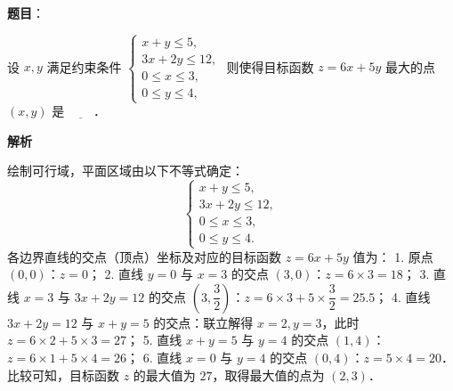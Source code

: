 \begin{answer}

\textbf{题目}：

设 $x, y$ 满足约束条件 $\begin{cases} x + y \leqslant 5, \\ 3x + 2y \leqslant 12, \\ 0 \leqslant x \leqslant 3, \\ 0 \leqslant y \leqslant 4, \end{cases}$ 则使得目标函数 $z = 6x + 5y$ 最大的点 $(x, y)$ 是 $\underline{\hspace{2em}}$．

\textbf{解析}

绘制可行域，平面区域由以下不等式确定：
\nopagebreak[4]
\[
\begin{cases} x + y \leqslant 5, \\ 3x + 2y \leqslant 12, \\ 0 \leqslant x \leqslant 3, \\ 0 \leqslant y \leqslant 4. \end{cases}
\]
各边界直线的交点（顶点）坐标及对应的目标函数 $z = 6x + 5y$ 值为：
1. 原点 $(0, 0)$：$z = 0$；
2. 直线 $y = 0$ 与 $x = 3$ 的交点 $(3, 0)$：$z = 6 \times 3 = 18$；
3. 直线 $x = 3$ 与 $3x + 2y = 12$ 的交点 $\left(3, \dfrac{3}{2}\right)$：$z = 6 \times 3 + 5 \times \dfrac{3}{2} = 25.5$；
4. 直线 $3x + 2y = 12$ 与 $x + y = 5$ 的交点：联立解得 $x = 2, y = 3$，此时 $z = 6 \times 2 + 5 \times 3 = 27$；
5. 直线 $x + y = 5$ 与 $y = 4$ 的交点 $(1, 4)$：$z = 6 \times 1 + 5 \times 4 = 26$；
6. 直线 $x = 0$ 与 $y = 4$ 的交点 $(0, 4)$：$z = 5 \times 4 = 20$．
比较可知，目标函数 $z$ 的最大值为 $27$，取得最大值的点为 $(2, 3)$．


\end{answer}
